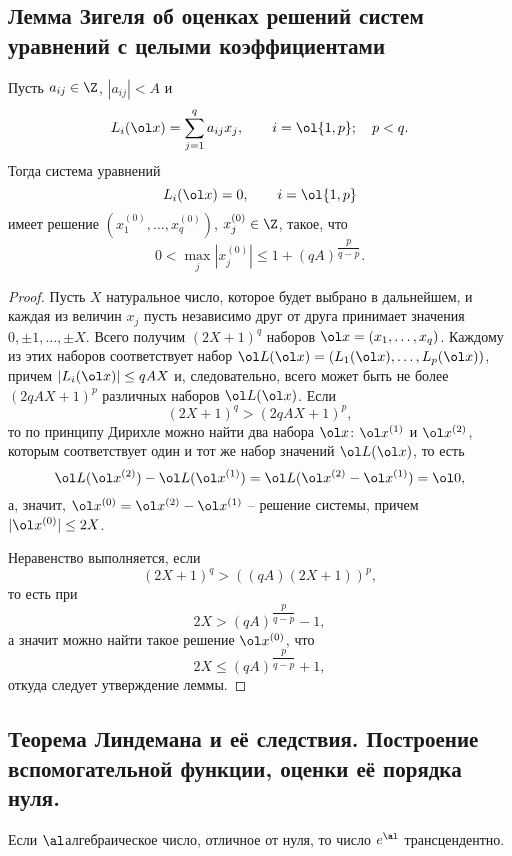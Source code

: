 \documentclass{article}
\begin{document}
\subsection{Лемма Зигеля об оценках решений систем уравнений с целыми коэффициентами}

\begin{lemma}
Пусть $a_{ij} \in \Z$, $|a_{ij}| < A$  и
$$
L_i(\ol x)= \sum_{j=1}^q a_{ij}x_j, \qquad  i= \ol {1,p}; \quad p<q.
$$
Тогда система уравнений
$$
L_i(\ol x)=0, \qquad i= \ol {1,p}
$$
имеет решение $(x_1^{(0)}, \dots, x_q^{(0)})$, $x_j^{(0)} \in \Z$,
такое, что
$$
0< \max_j |x_j^{(0)}| \le 1 + (qA)^{\dfrac p{q-p}}.
$$
\end{lemma}

\begin{proof}
Пусть $X$ \т натуральное число, которое будет выбрано
в дальнейшем, и каждая из величин $x_j$
пусть независимо друг от друга принимает
значения $0, \pm 1, \dots, \pm X.$ Всего получим $(2X+1)^q$ наборов
$\ol x=(x_1, \dots, x_q)$. Каждому из этих наборов соответствует набор
$\ol L(\ol x) = (L_1(\ol x ), \dots, L_p ( \ol x ))$, причем
$|L_i(\ol x )| \le qAX$  и, следовательно, всего может быть не более
$(2qAX+1)^p$ различных наборов   $\ol L ( \ol x )$.   Если
\begin{equation}[2]
(2X+1)^q > (2qAX+1)^p,
\end{equation}
то по принципу Дирихле можно найти два  набора  $\ol x$: $\ol x^{(1)}$
и $\ol x^{(2)}$, которым соответствует
один и тот же набор значений $\ol L (\ol x)$, то есть
$$
\ol L (\ol x^{(2)}) - \ol L (\ol x^{(1)}) = \ol L (\ol x^{(2)}- \ol x^{(1)})
= \ol 0,
$$
а, значит, $\ol x^{(0)} = \ol x^{(2)}- \ol x^{(1)}  $
-- решение системы, причем $|\ol x^{(0)}| \le 2X$.

Неравенство    выполняется, если
$$
(2X+1)^q > ((qA)(2X+1))^p,
$$
то есть при
$$
2X > (qA)^{\dfrac p{q-p}} -1,
$$
а значит можно найти такое решение $\ol x^{(0)}$, что
$$
2X \le (qA)^{\dfrac p{q-p}} +1,
$$
откуда следует утверждение леммы.
\end{proof}

\subsection{Теорема Линдемана и её следствия. Построение вспомогательной функции, оценки её порядка нуля.}

\begin{theorem}[Линдеман] Если  $\al$\т   алгебраическое
число, отличное от нуля, то число $e^{\al}$ трансцендентно.
\end{theorem}
\end{document}
